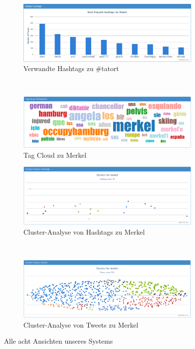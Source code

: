 \begin{figure}[h!]
\begin{subfigure}[t]{0.45\textwidth}
\includegraphics[width=\textwidth]{Bilder/Frontend/Screenshots/latestRelatedHashtagsTatort.png}
\caption{Verwandte Hashtags zu \glqq \#tatort\grqq}
\label{fig:viewRelatedHashtags}
\end{subfigure}
~
\begin{subfigure}[t]{0.45\textwidth}
\includegraphics[width=\textwidth]{Bilder/Frontend/Screenshots/latestTagCloudMerkel.png}
\caption{Tag Cloud zu \glqq Merkel\grqq}
\label{fig:viewTagCloud}
\end{subfigure}

\begin{subfigure}[t]{0.45\textwidth}
\includegraphics[width=\textwidth]{Bilder/Frontend/Screenshots/latestClusterHashtagMerkel.png}
\caption{Cluster-Analyse von Hashtags zu \glqq Merkel\grqq}
\label{fig:viewClusterHashtags}
\end{subfigure}
~
\begin{subfigure}[t]{0.45\textwidth}
\includegraphics[width=\textwidth]{Bilder/Frontend/Screenshots/latestClusterTweetsMerkel.png}
\caption{Cluster-Analyse von Tweets zu \glqq Merkel\grqq}
\label{fig:viewClusterTweets}
\end{subfigure}
\caption{Alle acht Ansichten unseres Systems}
\label{fig:viewScreenshots}
\end{figure}

